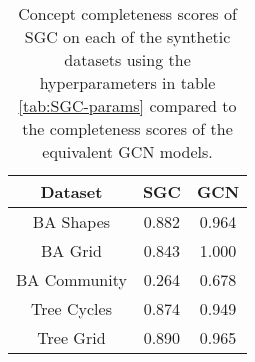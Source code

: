 \begin{table}
    \centering
    \begin{tabular}{c|c|c}
        \textbf{Dataset} &
        \textbf{SGC} &
        \textbf{GCN} \\
        \midrule
        BA Shapes       & 0.882 & 0.964 \\
        BA Grid         & 0.843 & 1.000 \\
        BA Community    & 0.264 & 0.678 \\
        Tree Cycles     & 0.874 & 0.949 \\
        Tree Grid       & 0.890 & 0.965 \\
    \end{tabular}
    \caption{Concept completeness scores of SGC on each of the synthetic datasets using the hyperparameters in table \ref{tab:SGC-params} compared to the completeness scores of the equivalent GCN models.}
    \label{tab:SGC-completeness}
\end{table}

